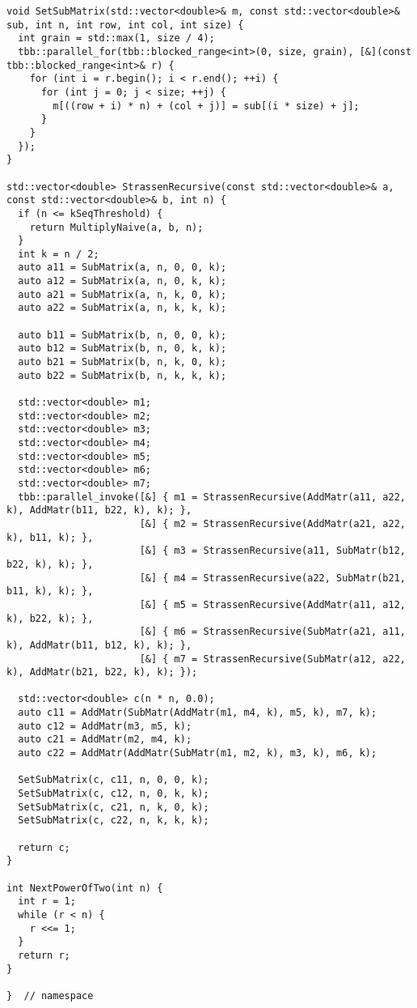 \documentclass[12pt]{article}
\begin{document}
\begin{lstlisting}
void SetSubMatrix(std::vector<double>& m, const std::vector<double>& sub, int n, int row, int col, int size) {
  int grain = std::max(1, size / 4);
  tbb::parallel_for(tbb::blocked_range<int>(0, size, grain), [&](const tbb::blocked_range<int>& r) {
    for (int i = r.begin(); i < r.end(); ++i) {
      for (int j = 0; j < size; ++j) {
        m[((row + i) * n) + (col + j)] = sub[(i * size) + j];
      }
    }
  });
}

std::vector<double> StrassenRecursive(const std::vector<double>& a, const std::vector<double>& b, int n) {
  if (n <= kSeqThreshold) {
    return MultiplyNaive(a, b, n);
  }
  int k = n / 2;
  auto a11 = SubMatrix(a, n, 0, 0, k);
  auto a12 = SubMatrix(a, n, 0, k, k);
  auto a21 = SubMatrix(a, n, k, 0, k);
  auto a22 = SubMatrix(a, n, k, k, k);

  auto b11 = SubMatrix(b, n, 0, 0, k);
  auto b12 = SubMatrix(b, n, 0, k, k);
  auto b21 = SubMatrix(b, n, k, 0, k);
  auto b22 = SubMatrix(b, n, k, k, k);

  std::vector<double> m1;
  std::vector<double> m2;
  std::vector<double> m3;
  std::vector<double> m4;
  std::vector<double> m5;
  std::vector<double> m6;
  std::vector<double> m7;
  tbb::parallel_invoke([&] { m1 = StrassenRecursive(AddMatr(a11, a22, k), AddMatr(b11, b22, k), k); },
                       [&] { m2 = StrassenRecursive(AddMatr(a21, a22, k), b11, k); },
                       [&] { m3 = StrassenRecursive(a11, SubMatr(b12, b22, k), k); },
                       [&] { m4 = StrassenRecursive(a22, SubMatr(b21, b11, k), k); },
                       [&] { m5 = StrassenRecursive(AddMatr(a11, a12, k), b22, k); },
                       [&] { m6 = StrassenRecursive(SubMatr(a21, a11, k), AddMatr(b11, b12, k), k); },
                       [&] { m7 = StrassenRecursive(SubMatr(a12, a22, k), AddMatr(b21, b22, k), k); });

  std::vector<double> c(n * n, 0.0);
  auto c11 = AddMatr(SubMatr(AddMatr(m1, m4, k), m5, k), m7, k);
  auto c12 = AddMatr(m3, m5, k);
  auto c21 = AddMatr(m2, m4, k);
  auto c22 = AddMatr(AddMatr(SubMatr(m1, m2, k), m3, k), m6, k);

  SetSubMatrix(c, c11, n, 0, 0, k);
  SetSubMatrix(c, c12, n, 0, k, k);
  SetSubMatrix(c, c21, n, k, 0, k);
  SetSubMatrix(c, c22, n, k, k, k);

  return c;
}

int NextPowerOfTwo(int n) {
  int r = 1;
  while (r < n) {
    r <<= 1;
  }
  return r;
}

}  // namespace


\end{lstlisting}
\end{document}
